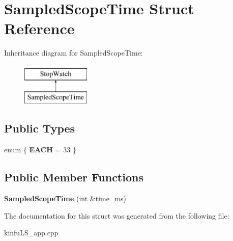 \hypertarget{struct_sampled_scope_time}{\section{Sampled\+Scope\+Time Struct Reference}
\label{struct_sampled_scope_time}
}
Inheritance diagram for Sampled\+Scope\+Time\+:\begin{figure}[H]
\begin{center}
\leavevmode
\includegraphics[height=2.000000cm]{struct_sampled_scope_time}
\end{center}
\end{figure}
\subsection*{Public Types}
\begin{DoxyCompactItemize}
\item 
\hypertarget{struct_sampled_scope_time_a3f7d1737ccbbe54c16f585f47affeb7d}{enum \{ {\bfseries E\+A\+C\+H} = 33
 \}}\label{struct_sampled_scope_time_a3f7d1737ccbbe54c16f585f47affeb7d}

\end{DoxyCompactItemize}
\subsection*{Public Member Functions}
\begin{DoxyCompactItemize}
\item 
\hypertarget{struct_sampled_scope_time_acb560b4832e10ccb05ed6764c21e0274}{{\bfseries Sampled\+Scope\+Time} (int \&time\+\_\+ms)}\label{struct_sampled_scope_time_acb560b4832e10ccb05ed6764c21e0274}

\end{DoxyCompactItemize}


The documentation for this struct was generated from the following file\+:\begin{DoxyCompactItemize}
\item 
kinfu\+L\+S\+\_\+app.\+cpp\end{DoxyCompactItemize}
